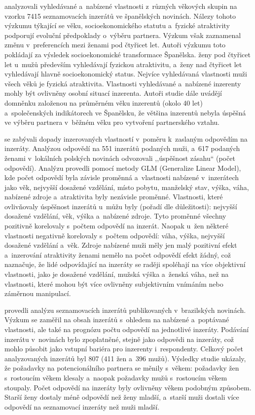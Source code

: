 \documentclass[a4paper, 12pt, notitlepage, oneside, numbers=noenddot]{report}
\begin{document}
\citet{Gil-BurmanPelaezSanchez2002} analyzovali vyhledávané a~nabízené
vlastnosti z~různých věkových skupin na vzorku 7415 seznamovacích
inzerátů ve španělských novinách. Nálezy tohoto výzkumu týkající se
věku, socioekonomického statutu a~fyzické atraktivity podporují
evoluční předpoklady o~výběru partnera. Výzkum však zaznamenal změnu
v~preferencích mezi ženami pod čtyřicet let. Autoři výzkumu toto
pokládají za výsledek socioekonomické transformace Španělska. ženy pod
čtyřicet let u~mužů především vyhledávají fyzickou atraktivitu, a~ženy
nad čtyřicet let vyhledávají hlavně socioekonomický status. Nejvíce
vyhledávaná vlastnosti muži všech věků je fyzická
atraktivita. Vlastnosti vyhledávané a~nabízené inzerenty mohly být
ovlivněny osobní situací inzerenta. Autoři studie dále uvádějí
domněnku založenou na průměrném věku inzerentů (okolo 40 let)
a~společenských indikátorech ve Španělsku, že většina inzerentů nebyla
úspěšná ve výběru partnera v~běžném věku pro vytvoření partnerského
vztahu.

\citet{PawlowskiKoziel2002} se zabývali dopady inzerovaných
vlastností v~poměru k~zaslaným odpovědím na inzeráty.  Analýzou
odpovědí na 551 inzerátů podaných muži, a~617 podaných ženami
v~lokálních polských novinách odvozovali ,,úspěšnost zásahu`` (počet
odpovědí). Analýzu provedli pomocí metody GLM (Generalize Linear
Model), kde počet odpovědí byla závisle proměnná a~vlastnosti nabízené
v~inzerátech jako věk, nejvyšší dosažené vzdělání, místo pobytu,
manželský stav, výška, váha, nabízené zdroje a~atraktivita byly
nezávisle proměnné. Vlastnosti, které ovlivňovaly úspěšnost inzerátů
u~můžu byly (pořadí dle důležitosti): nejvyšší dosažené vzdělání, věk,
výška a~nabízené zdroje. Tyto proměnné všechny pozitivně korelovaly
s~počtem odpovědí na inzerát. Naopak u~žen některé vlastnosti
negativně korelovaly s~počtem odpovědí: váha, výška, nejvyšší dosažené
vzdělání a~věk. Zdroje nabízené muži měly jen malý pozitivní efekt
a~inzerování atraktivity ženami nemělo na počet odpovědí efekt žádný,
což naznačuje, že lidé odpovídající na inzeráty se raději spoléhají na
více objektivní vlastnosti, jako je dosažené vzdělání, mužská výška
a~ženská váha, než na vlastnosti, které mohou být více ovlivněny
subjektivním vnímáním nebo záměrnou manipulací.

\citet{CamposOttaSiquera2002} provedli analýzu seznamovacích inzerátů
publikovaných v~brazilských novinách.  Výzkum se zaměřil na obsah
inzerátů s~ohledem na nabízené a~poptávané vlastnosti, ale také na
prognózu počtu odpovědí na jednotlivé inzeráty.  Podávání inzerátu
v~novinách bylo zpoplatněné, stejně jako odpovědi na inzeráty, což
mohlo působit jako vstupní bariéra pro inzerenty i~respondenty.
Celkový počet analyzovaných inzerátů byl 807 (411 žen a~396 mužů).
Výsledky studie ukázaly, že požadavky na potencionálního partnera se
měnily s~věkem: požadavky žen s~rostoucím věkem klesaly a~naopak
požadavky mužů s~rostoucím věkem stoupaly.  Počet odpovědí na inzeráty
byly ovlivněny věkem podobným způsobem.  Starší ženy dostaly méně
odpovědí než ženy mladší, a~starší muži dostali více odpovědí na
seznamovací inzeráty než muži mladší.
\end{document}
